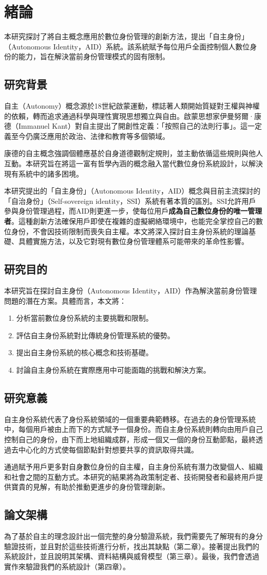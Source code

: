 
\chapter{緒論}
本研究探討了將自主概念應用於數位身份管理的創新方法，提出「自主身份」（Autonomous Identity，AID）系統。該系統賦予每位用戶全面控制個人數位身份的能力，旨在解決當前身份管理模式的固有限制。
\section{研究背景}
自主（Autonomy）概念源於18世紀啟蒙運動，標誌著人類開始質疑對王權與神權的依賴，轉而追求通過科學與理性實現思想獨立與自由。啟蒙思想家伊曼努爾·康德（Immanuel Kant）對自主提出了開創性定義：「按照自己的法則行事」。這一定義至今仍廣泛應用於政治、法律和教育等多個領域。

康德的自主概念強調個體應基於自身道德觀制定規則，並主動依循這些規則與他人互動。本研究旨在將這一富有哲學內涵的概念融入當代數位身份系統設計，以解決現有系統中的諸多困境。

本研究提出的「自主身份」（Autonomous Identity，AID）概念與目前主流探討的「自治身份」（Self-sovereign identity，SSI）系統有著本質的區別。SSI允許用戶參與身份管理過程，而AID則更進一步，使每位用戶\textbf{成為自己數位身份的唯一管理者}。這種創新方法確保用戶即使在複雜的虛擬網絡環境中，也能完全掌控自己的數位身份，不會因技術限制而喪失自主權。本文將深入探討自主身份系統的理論基礎、具體實施方法，以及它對現有數位身份管理體系可能帶來的革命性影響。
\section{研究目的}
本研究旨在探討自主身份（Autonomous Identity，AID）作為解決當前身份管理問題的潛在方案。具體而言，本文將：
\begin{enumerate}
  \item 分析當前數位身份系統的主要挑戰和限制。
  \item 評估自主身份系統對比傳統身份管理系統的優勢。
  \item 提出自主身份系統的核心概念和技術基礎。
  \item 討論自主身份系統在實際應用中可能面臨的挑戰和解決方案。
\end{enumerate}
\section{研究意義}
自主身份系統代表了身份系統領域的一個重要典範轉移。在過去的身份管理系統中，每個用戶被由上而下的方式賦予一個身份。而自主身份系統則轉向由用戶自己控制自己的身份，由下而上地組織成群，形成一個又一個的身份互動節點，最終透過去中心化的方式使每個節點針對想要共享的資訊取得共識。

通過賦予用戶更多對自身數位身份的自主權，自主身份系統有潛力改變個人、組織和社會之間的互動方式。本研究的結果將為政策制定者、技術開發者和最終用戶提供寶貴的見解，有助於推動更進步的身份管理創新。
\section{論文架構}
為了基於自主的理念設計出一個完整的身分驗證系統，我們需要先了解現有的身分驗證技術，並且對於這些技術進行分析，找出其缺點（第二章）。接著提出我們的系統設計，並且說明其架構、資料結構與威脅模型（第三章）。最後，我們會透過實作來驗證我們的系統設計（第四章）。